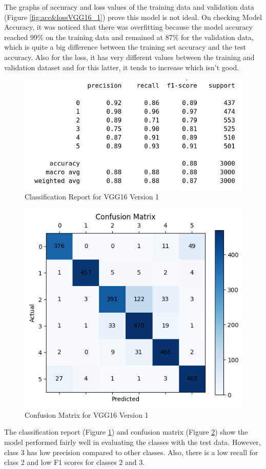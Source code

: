\documentclass[conference]{IEEEtran}
\begin{document}
The graphs of accuracy and loss values of the training data and validation data (Figure \ref{fig:acc&lossVGG16_1}) prove this model is not ideal. On checking Model Accuracy, it was noticed that there was overfitting because the model accuracy reached 99\% on the training data and remained at 87\% for the validation data, which is quite a big difference between the training set accuracy and the test accuracy. Also for the loss, it has very different values between the training and validation dataset and for this latter, it tends to increase which isn't good.

\begin{figure}[H]
    \centering
    \includegraphics[width=0.7\linewidth]{images/classReportVGG16_1.png}
    \caption{Classification Report for VGG16 Version 1}
    \label{fig:classReportVGG16_1}
\end{figure}

\begin{figure}[H]
    \centering
    \includegraphics[width=0.7\linewidth]{images/confMatrixVGG16_1.png}
    \caption{Confusion Matrix for VGG16 Version 1}
    \label{fig:confMatrixVGG16_1}
\end{figure}

The classification report (Figure \ref{fig:classReportVGG16_1}) and confusion matrix (Figure \ref{fig:confMatrixVGG16_1}) show the model performed fairly well in evaluating the classes with the test data. However, class 3 has low precision compared to other classes. Also, there is a low recall for class 2 and low F1 scores for classes 2 and 3.
\end{document}
